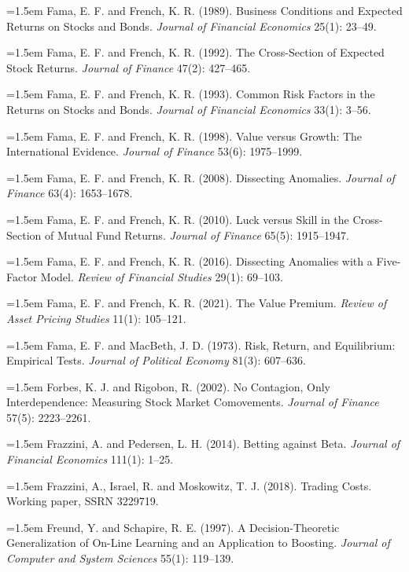 \hangindent=1.5em Fama, E. F. and French, K. R. (1989). Business Conditions and Expected Returns on Stocks and Bonds. \emph{Journal of Financial Economics} 25(1): 23--49.

\hangindent=1.5em Fama, E. F. and French, K. R. (1992). The Cross-Section of Expected Stock Returns. \emph{Journal of Finance} 47(2): 427--465.

\hangindent=1.5em Fama, E. F. and French, K. R. (1993). Common Risk Factors in the Returns on Stocks and Bonds. \emph{Journal of Financial Economics} 33(1): 3--56.

\hangindent=1.5em Fama, E. F. and French, K. R. (1998). Value versus Growth: The International Evidence. \emph{Journal of Finance} 53(6): 1975--1999.

\hangindent=1.5em Fama, E. F. and French, K. R. (2008). Dissecting Anomalies. \emph{Journal of Finance} 63(4): 1653--1678.

\hangindent=1.5em Fama, E. F. and French, K. R. (2010). Luck versus Skill in the Cross-Section of Mutual Fund Returns. \emph{Journal of Finance} 65(5): 1915--1947.

\hangindent=1.5em Fama, E. F. and French, K. R. (2016). Dissecting Anomalies with a Five-Factor Model. \emph{Review of Financial Studies} 29(1): 69--103.

\hangindent=1.5em Fama, E. F. and French, K. R. (2021). The Value Premium. \emph{Review of Asset Pricing Studies} 11(1): 105--121.

\hangindent=1.5em Fama, E. F. and MacBeth, J. D. (1973). Risk, Return, and Equilibrium: Empirical Tests. \emph{Journal of Political Economy} 81(3): 607--636.

\hangindent=1.5em Forbes, K. J. and Rigobon, R. (2002). No Contagion, Only Interdependence: Measuring Stock Market Comovements. \emph{Journal of Finance} 57(5): 2223--2261.

\hangindent=1.5em Frazzini, A. and Pedersen, L. H. (2014). Betting against Beta. \emph{Journal of Financial Economics} 111(1): 1--25.

\hangindent=1.5em Frazzini, A., Israel, R. and Moskowitz, T. J. (2018). Trading Costs. Working paper, SSRN 3229719.

\hangindent=1.5em Freund, Y. and Schapire, R. E. (1997). A Decision-Theoretic Generalization of On-Line Learning and an Application to Boosting. \emph{Journal of Computer and System Sciences} 55(1): 119--139.

